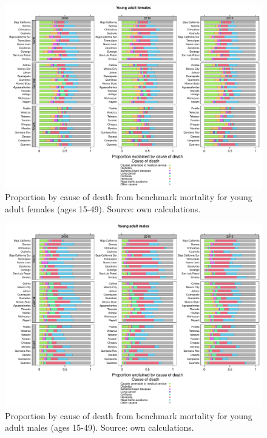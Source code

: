 \documentclass[11.5pt]{article}
\begin{document}
{\begin{figure}
\centering
\caption{Proportion by cause of death from benchmark mortality for young adult females (ages 15-49). Source: own calculations.}
\begin{center}
\includegraphics[scale=.45]{Figure_prop_yaf.pdf}
\end{center}
\end{figure}


\begin{figure}
\centering
\caption{Proportion by cause of death from benchmark mortality for young adult males (ages 15-49). Source: own calculations.}
\begin{center}
\includegraphics[scale=.45]{Figure_prop_yam.pdf}
\end{center}
\end{figure}


}
\end{document}
